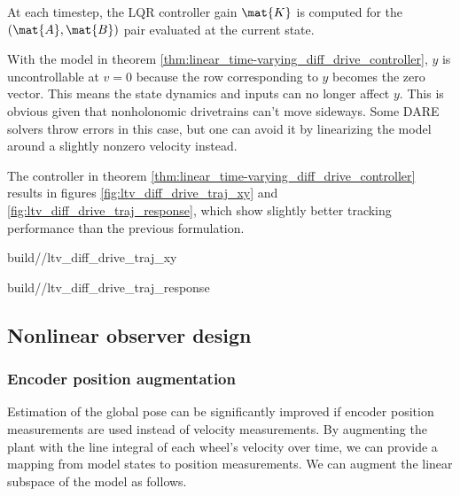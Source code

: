 \begin{theorem}
  At each timestep, the LQR controller gain $\mat{K}$ is computed for the
  $(\mat{A}, \mat{B})$ pair evaluated at the current state.
\end{theorem}

With the \gls{model} in theorem
\ref{thm:linear_time-varying_diff_drive_controller}, $y$ is uncontrollable at
$v = 0$ because the row corresponding to $y$ becomes the zero vector. This means
the state dynamics and inputs can no longer affect $y$. This is obvious given
that nonholonomic drivetrains can't move sideways. Some DARE solvers throw
errors in this case, but one can avoid it by linearizing the model around a
slightly nonzero velocity instead.

The controller in theorem \ref{thm:linear_time-varying_diff_drive_controller}
results in figures \ref{fig:ltv_diff_drive_traj_xy} and
\ref{fig:ltv_diff_drive_traj_response}, which show slightly better tracking
performance than the previous formulation.
\begin{bookfigure}
  \begin{minisvg}{2}{build/\chapterpath/ltv_diff_drive_traj_xy}
    \caption{Linear time-varying differential drive controller x-y plot}
    \label{fig:ltv_diff_drive_traj_xy}
  \end{minisvg}
  \hfill
  \begin{minisvg}{2}{build/\chapterpath/ltv_diff_drive_traj_response}
    \caption{Linear time-varying differential drive controller response}
    \label{fig:ltv_diff_drive_traj_response}
  \end{minisvg}
\end{bookfigure}

\subsection{Nonlinear observer design}

\subsubsection{Encoder position augmentation}

Estimation of the global pose can be significantly improved if encoder position
measurements are used instead of velocity measurements. By augmenting the plant
with the line integral of each wheel's velocity over time, we can provide a
mapping from model states to position measurements. We can augment the linear
subspace of the model as follows.

